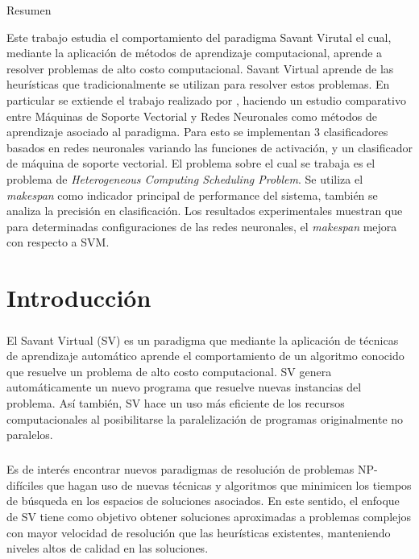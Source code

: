 Resumen

Este trabajo estudia el comportamiento del paradigma Savant Virutal el cual, mediante la aplicación de métodos de aprendizaje computacional, aprende a resolver problemas de alto costo computacional. Savant Virtual aprende de las heurísticas que tradicionalmente se utilizan para resolver estos problemas. En particular se extiende el trabajo realizado por \citet{savant-original}, haciendo un estudio comparativo entre Máquinas de Soporte Vectorial y Redes Neuronales como métodos de aprendizaje asociado al paradigma. 
Para esto se implementan 3 clasificadores basados en redes neuronales variando las funciones de activación, y un clasificador de máquina de soporte vectorial. El problema sobre el cual se trabaja es el problema de \textit{Heterogeneous Computing Scheduling Problem}. Se utiliza el \textit{makespan} como indicador principal de performance del sistema, también se analiza la precisión en clasificación. Los resultados experimentales muestran que para determinadas configuraciones de las redes neuronales, el \textit{makespan} mejora con respecto a SVM.


\chapter{Introducción} \label{section-introduccion}

\paragraph{} El Savant Virtual (SV) es un paradigma que mediante la aplicación de técnicas de aprendizaje automático aprende el comportamiento de un algoritmo conocido que resuelve un problema de alto costo computacional. SV genera automáticamente un nuevo programa que resuelve nuevas instancias del problema.\cite{savant-original}
Así también, SV hace un uso más eficiente de los recursos computacionales al posibilitarse la paralelización de programas originalmente no paralelos.

\paragraph{} Es de interés encontrar nuevos paradigmas de resolución de problemas NP-difíciles que hagan uso de nuevas técnicas y algoritmos que minimicen los tiempos de búsqueda en los espacios de soluciones asociados.
En este sentido, el enfoque de SV tiene como objetivo obtener soluciones aproximadas a problemas complejos con mayor velocidad de resolución que las heurísticas existentes, manteniendo niveles altos de calidad en las soluciones. 

